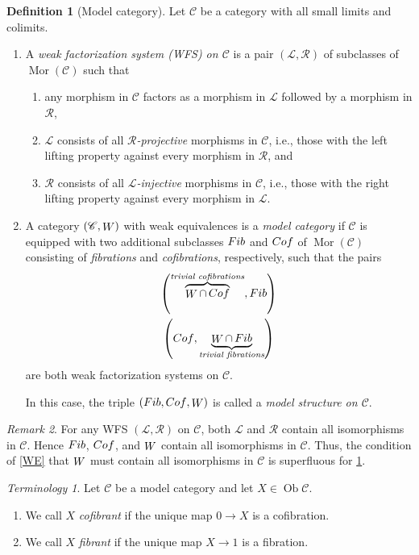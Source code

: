 \documentclass[10pt,letterpaper,cm]{nupset}
\theoremstyle{definition}
\newtheorem{definition}{Definition}[subsection]
\theoremstyle{theorem}
\theoremstyle{remark}
\newtheorem{remark}[definition]{Remark}
\newtheorem*{term}{Terminology}
\renewcommand{\L}{\mathcal L}
\newcommand{\RI}{\mathcal R}
\DeclareMathOperator{\ob}{Ob}
\DeclareMathOperator{\mor}{Mor}
\newcommand{\0}{\mathbf{0}}
\newcommand{\1}{\mathbf{1}}
\newcommand{\2}{\mathbf{2}}
\renewcommand{\c}{\mathscr{C}}
\DeclareMathOperator{\fib}{\mathnormal{Fib}}
\DeclareMathOperator{\cof}{\mathnormal{Cof}}
\DeclareMathOperator{\we}{\mathnormal{W}}
\newcommand{\be}{\begin{enumerate}}
\newcommand{\ee}{\end{enumerate}}
\begin{document}
\begin{definition}[Model category]\label{MC} Let $\c$ be a category with all small limits and colimits.
\be
\item A \textit{weak factorization system (WFS) on $\c$} is a pair $\left(\L, \RI\right)$ of subclasses of $\mor(\c)$ such that 
\be[label=(\roman*)]
\item any morphism in $\c$ factors as a morphism in $\L$ followed by a morphism in $\RI$,
\item $\L$ consists of all \textit{$\RI$-projective} morphisms in $\c$, i.e., those with the left lifting property against every morphism in $\RI$, and
\item $\RI$ consists of all \textit{$\L$-injective} morphisms in $\c$, i.e., those with the right lifting property against every morphism in $\L$.
\ee
\item A category $\left(\c, \we\right)$ with weak equivalences is a \textit{model category} if $\c$ is equipped with two additional subclasses $\fib$ and $\cof$ of $\mor(\c)$ consisting of \textit{fibrations} and \textit{cofibrations}, respectively, such that the pairs
\begin{gather*}
\left(\overbrace{\we \cap \cof}^{\textit{trivial cofibrations}} , \fib  \right)
\\ \left(\cof, \underbrace{\we \cap \fib}_{\textit{trivial fibrations}}   \right)
\end{gather*}
 are both weak factorization systems on $\c$.
 
 In this case,  the triple $\left(\fib, \cof, \we\right)$ is called a \textit{model structure on $\c$}.
\ee
\end{definition}

\begin{remark}
For any WFS $\left(\L, \RI\right)$ on $\c$, both $\L$ and $\RI$ contain all isomorphisms in $\c$. Hence $\fib$, $\cof$, and $\we$ contain all isomorphisms in $\c$. Thus, the condition of \cref{WE} that $\we$ must contain all isomorphisms in $\c$ is superfluous for \cref{MC}.
\end{remark}

\smallskip

\begin{term} Let $\c$ be a model category and let $X\in \ob{\c}$.
\be
\item We call $X$ \textit{cofibrant} if the unique map $0\to X$ is a cofibration.
\item We call $X$ \textit{fibrant} if the unique map $X\to 1$ is a fibration.
\ee
\end{term}
\end{document}
